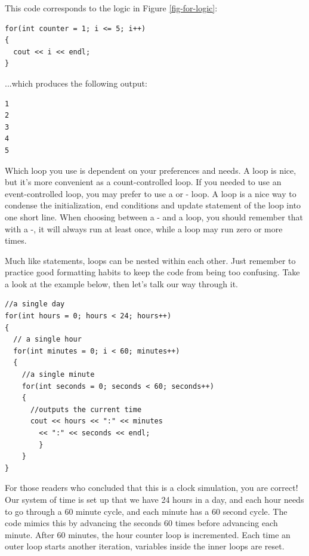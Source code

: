 \noindent This code corresponds to the logic in Figure \ref{fig-for-logic}:

\noindent\begin{minipage}{\linewidth}\begin{lstlisting}
for(int counter = 1; i <= 5; i++)
{
  cout << i << endl;
}
\end{lstlisting}\end{minipage}

\noindent ...which produces the following output:

\noindent\begin{minipage}{\linewidth}\begin{lstlisting}
1
2
3
4
5
\end{lstlisting}\end{minipage}


Which loop you use is dependent on your preferences and needs.
A  loop is nice, but it's more convenient as a count-controlled loop.
If you needed to use an event-controlled loop, you may prefer to use a  or - loop.
A  loop is a nice way to condense the initialization, end conditions and update statement of the loop into one short line.
When choosing between a - and a  loop, you should remember that with a -, it will always run at least once, while a  loop may run zero or more times.


Much like  statements, loops can be nested within each other.
Just remember to practice good formatting habits to keep the code from being too confusing.
Take a look at the example below, then let's talk our way through it.

\noindent\begin{minipage}{\linewidth}\begin{lstlisting}
//a single day
for(int hours = 0; hours < 24; hours++)	
{
  // a single hour
  for(int minutes = 0; i < 60; minutes++)	
  {
    //a single minute 
    for(int seconds = 0; seconds < 60; seconds++) 	
    {
      //outputs the current time
      cout << hours << ":" << minutes
        << ":" << seconds << endl;
		}
	}
}
\end{lstlisting}\end{minipage}

For those readers who concluded that this is a clock simulation, you are correct!
Our system of time is set up that we have 24 hours in a day, and each hour needs to go through a 60 minute cycle, and each minute has a 60 second cycle.
The code mimics this by advancing the seconds 60 times before advancing each minute.
After 60 minutes, the hour counter loop is incremented. Each time an outer loop starts another iteration, variables inside the inner loops are reset.

